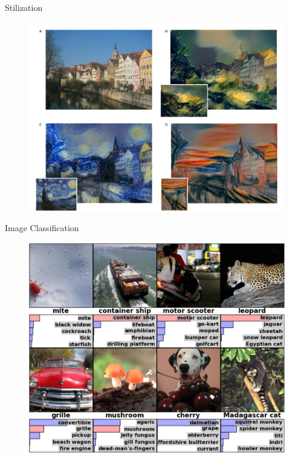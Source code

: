 \documentclass{beamer}
\begin{document}
    \begin{frame}{Stilization \cite{gatys2016image}}
      \begin{figure}
      \includegraphics[width=0.6\linewidth]{./figures/neuralstyle.png}
      \end{figure}
    \end{frame}

    \begin{frame}{Image Classification \cite{DBLP:conf/nips/KrizhevskySH12}}
      \begin{figure}
        \includegraphics[scale=0.25]{./figures/classification.png}
      \end{figure}
    \end{frame}
\end{document}
